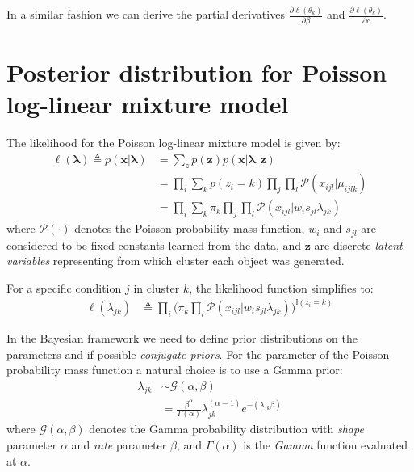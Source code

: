 In a similar fashion we can derive the partial derivatives $\frac{\partial \ell(\theta_{k})}{\partial \beta}$ and $\frac{\partial \ell(\theta_{k})}{\partial c}$.




\section{Posterior distribution for Poisson log-linear mixture model}

The likelihood for the Poisson log-linear mixture model is given by:
\begin{equation} \label{poisson-log-lin-mm-app}
  \begin{split}
	\ell(\mathbf{\lambda}) \triangleq p(\mathbf{x} | \mathbf{\lambda}) & = \sum\limits_{z} p(\mathbf{z}) p(\mathbf{x} | \mathbf{\lambda}, \mathbf{z})\\
		& = \prod_{i} \sum_{k} p(z_{i} = k) \prod_{j} \prod_{l} \mathcal{P}(x_{ijl} | \mu_{ijlk}) \\
		& = \prod_{i} \sum_{k} \pi_{k} \prod_{j} \prod_{l} \mathcal{P}(x_{ijl} | w_{i}s_{jl} \lambda_{jk})
  \end{split}
\end{equation}
where $\mathcal{P}(\cdot)$ denotes the Poisson probability mass function, $w_{i}$ and $s_{jl}$ are considered to be fixed constants learned from the data, and $\mathbf{z}$ are discrete \emph{latent variables} representing from which cluster each object was generated. 

For a specific condition $j$ in cluster $k$, the likelihood function simplifies to:
\begin{equation} \label{poisson-log-lin-mm-jk-app}
  \begin{split}
	\ell(\lambda_{jk}) & \triangleq \prod_{i} \bigg( \pi_{k} \prod_{l} \mathcal{P}(x_{ijl} | w_{i}s_{jl} \lambda_{jk})\bigg)^{\mathbb{I}(z_{i}=k)}
  \end{split}
\end{equation}

In the Bayesian framework we need to define prior distributions on the parameters and if possible \emph{conjugate priors}. For the parameter of the Poisson probability mass function a natural choice is to use a Gamma prior:
\begin{equation} \label{poisson-prior-mm-app}
  \begin{split}
  \lambda_{jk} & \sim \mathcal{G}(\alpha, \beta) \\
  	& = \frac{\beta^{\alpha}}{\Gamma(\alpha)}\lambda_{jk}^{(\alpha-1)} e^{-(\lambda_{jk}\beta)}
    \end{split}
\end{equation}
where $\mathcal{G}(\alpha, \beta)$ denotes the Gamma probability distribution with \emph{shape} parameter $\alpha$ and \emph{rate} parameter $\beta$, and $\Gamma(\alpha)$ is the \emph{Gamma} function evaluated at $\alpha$.

